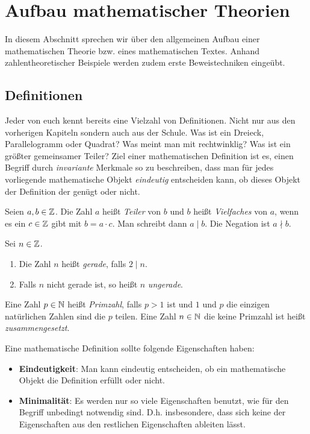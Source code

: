 \chapter{Aufbau mathematischer Theorien}

In diesem Abschnitt sprechen wir über den allgemeinen Aufbau einer mathematischen Theorie bzw. eines mathematischen Textes. 
Anhand zahlentheoretischer Beispiele werden zudem erste Beweistechniken eingeübt. 

\section{Definitionen}

Jeder von euch kennt bereits eine Vielzahl von Definitionen. Nicht nur aus den vorherigen Kapiteln sondern auch aus der Schule. 
Was ist ein Dreieck, Parallelogramm oder Quadrat? Was meint man mit rechtwinklig? Was ist ein größter gemeinsamer Teiler?
Ziel einer mathematischen Definition ist es, einen Begriff durch \textit{invariante} Merkmale so zu beschreiben, dass man für jedes 
vorliegende mathematische Objekt \textit{eindeutig} entscheiden kann, ob dieses Objekt der Definition der genügt oder nicht. 

\begin{mydef}
    Seien $a,b \in \mathbb{Z}$. Die Zahl $a$ heißt \textit{Teiler} von $b$ und $b$ heißt \textit{Vielfaches} von $a$, wenn es ein $c \in \mathbb{Z}$ gibt mit 
    $b = a \cdot c$. Man schreibt dann $a \mid b$. Die Negation ist $a \nmid b$. 
\end{mydef}

\begin{mydef}
    Sei $n \in \mathbb{Z}$. 
    \begin{enumerate}
        \item 
        Die Zahl $n$ heißt \textit{gerade}, falls $2 \mid n$. 
        \item 
        Falls $n$ nicht gerade ist, so heißt $n$ \textit{ungerade}. 
    \end{enumerate}
\end{mydef}

\begin{mydef}
    Eine Zahl $p \in \mathbb{N}$ heißt \textit{Primzahl}, falls $p > 1$ ist und $1$ und $p$ die einzigen natürlichen Zahlen sind die $p$ teilen. Eine Zahl $n \in \mathbb{N}$ die keine Primzahl ist heißt \textit{zusammengesetzt}. 
\end{mydef}

Eine mathematische Definition sollte folgende Eigenschaften haben: 
\begin{itemize}
    \item 
    \textbf{Eindeutigkeit}: Man kann eindeutig entscheiden, ob ein mathematische Objekt die Definition erfüllt oder nicht. 
    \item 
    \textbf{Minimalität}: Es werden nur so viele Eigenschaften benutzt, wie für den Begriff unbedingt notwendig sind. 
    D.h. insbesondere, dass sich keine der Eigenschaften aus den restlichen Eigenschaften ableiten lässt. 
\end{itemize}

